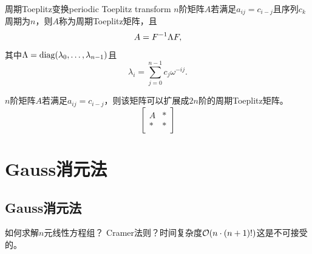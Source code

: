 \begin{theorem}
    {周期Toeplitz变换}{periodic Toeplitz transform}
    $n$阶矩阵$A$若满足$a_{ij}=c_{i-j}$且序列$c_k$周期为$n$，则$A$称为周期Toeplitz矩阵，且
    \begin{equation}
        A=F^{-1}\Lambda F,
    \end{equation}
    其中$\Lambda=\operatorname{diag}(\lambda_0,\ldots,\lambda_{n-1})$且
    \begin{equation}
        \lambda_i=\sum_{j=0}^{n-1}c_j\omega^{-ij}.
    \end{equation}
\end{theorem}

\begin{remark}
    $n$阶矩阵$A$若满足$a_{ij}=c_{i-j}$，则该矩阵可以扩展成$2n$阶的周期Toeplitz矩阵。
    \[
        \begin{bmatrix}
            A&*\\ *&*
        \end{bmatrix}
    \]
\end{remark}

\section{Gauss消元法}
\label{sec:Gauss elimination}



\subsection{Gauss消元法}

如何求解$n$元线性方程组？
Cramer法则？时间复杂度$\mathcal O(n\cdot(n+1)!)$这是不可接受的。

